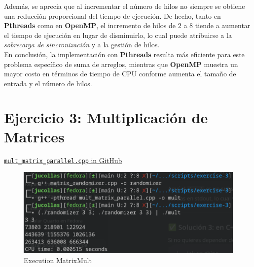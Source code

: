 \documentclass[12pt]{article}
\begin{document}
Además, se aprecia que al incrementar el número de hilos no siempre se obtiene una reducción proporcional del tiempo de ejecución. De hecho, tanto en \textbf{Pthreads} como en \textbf{OpenMP}, el incremento de hilos de $2$ a $8$ tiende a aumentar el tiempo de ejecución en lugar de disminuirlo, lo cual puede atribuirse a la \textit{sobrecarga de sincronización} y a la gestión de hilos. \\

En conclusión, la implementación con \textbf{Pthreads} resulta más eficiente para este problema específico de suma de arreglos, mientras que \textbf{OpenMP} muestra un mayor costo en términos de tiempo de CPU conforme aumenta el tamaño de entrada y el número de hilos.



\section*{Ejercicio 3: Multiplicación de Matrices}

\begin{center}
    \href{https://github.com/jucollas/parallel-programming/blob/main/practical-session-2/scripts/exercise-3/mult_matrix_parallel.cpp}{\faGithub \texttt{mult\_matrix\_parallel.cpp} in GitHub}
\end{center}
\begin{figure}[H]
    \centering
    \includegraphics[width=0.8\linewidth]{images/execution-matrix-mult.png}
    \caption{Execution MatrixMult}
    \label{fig:os}
\end{figure}
\end{document}
